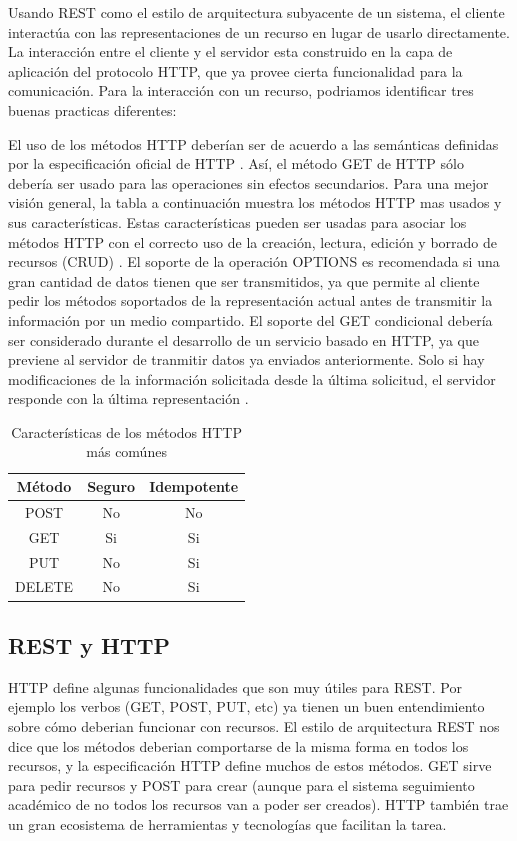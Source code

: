 Usando REST como el estilo de arquitectura subyacente de un sistema, el cliente interactúa con las representaciones de un recurso en lugar de usarlo directamente. La interacción entre el cliente y el servidor esta construido en la capa de aplicación del protocolo HTTP, que ya provee cierta funcionalidad para la comunicación. Para la interacción con un recurso, podriamos identificar tres buenas practicas diferentes:
\begin{outline}
    \1 El uso de los métodos HTTP deberían ser de acuerdo a las semánticas definidas por la especificación oficial de HTTP \cite{WAPID}. Así, el método GET de HTTP sólo debería ser usado para las operaciones sin efectos secundarios. Para una mejor visión general, la tabla a continuación muestra los métodos HTTP mas usados y sus características. Estas características pueden ser usadas para asociar los métodos HTTP con el correcto uso de la creación, lectura, edición y borrado de recursos (CRUD) \cite{RVINOSKI}.
    \1 El soporte de la operación OPTIONS es recomendada si una gran cantidad de datos tienen que ser transmitidos, ya que permite al cliente pedir los métodos soportados de la representación actual antes de transmitir la información por un medio compartido. 
    \1 El soporte del GET condicional debería ser considerado durante el desarrollo de un servicio basado en HTTP, ya que previene al servidor de tranmitir datos ya enviados anteriormente. Solo si hay modificaciones de la información solicitada desde la última solicitud, el servidor responde con la última representación  \cite{RVINOSKI}.
\end{outline}

\begin{table}[]
    \centering
    \makegapedcells
    \begin{tabular}{|c|c|c|}
    \hline
    Método & Seguro & Idempotente \\ \hline
    POST & No & No \\ \hline
    GET & Si & Si \\ \hline
    PUT & No & Si \\ \hline
    DELETE & No & Si \\ \hline
    
    \end{tabular}
    \caption{Características de los métodos HTTP más comúnes}
    \label{tab:tabla_planes}
\end{table}

\subsection[REST y HTTP]{REST y HTTP}
HTTP define algunas funcionalidades que son muy útiles para REST. Por ejemplo los verbos (GET, POST, PUT, etc) ya tienen un buen entendimiento sobre cómo deberian funcionar con recursos. El estilo de arquitectura REST nos dice que los métodos deberian comportarse de la misma forma en todos los recursos, y la especificación HTTP define muchos de estos métodos. 
GET sirve para pedir recursos y POST para crear (aunque para el sistema seguimiento académico de no todos los recursos van a poder ser creados).
HTTP también trae un gran ecosistema de herramientas y tecnologías que facilitan la tarea. 


